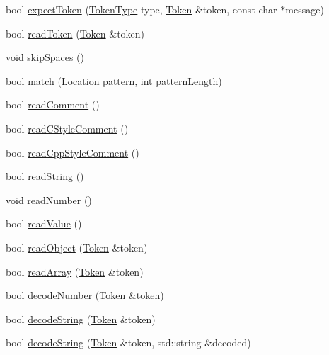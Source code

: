 \begin{DoxyCompactItemize}
\item 
bool \hyperlink{classJson_1_1Reader_a442d779d60825634625040eed83eadc5}{expect\-Token} (\hyperlink{classJson_1_1Reader_aa35e6ab574dc399a0a645ad98ed66bc9}{Token\-Type} type, \hyperlink{classJson_1_1Reader_1_1Token}{Token} \&token, const char $\ast$message)
\item 
bool \hyperlink{classJson_1_1Reader_a7cb0631963cc0fd4ff6ed0f570976864}{read\-Token} (\hyperlink{classJson_1_1Reader_1_1Token}{Token} \&token)
\item 
void \hyperlink{classJson_1_1Reader_a40d0f69d15aeb2d52ff78d794f5ab8b2}{skip\-Spaces} ()
\item 
bool \hyperlink{classJson_1_1Reader_a3e5a7bc6b7b53f2ca8cb9da42f8ffb21}{match} (\hyperlink{classJson_1_1Reader_a46795b5b272bf79a7730e406cb96375a}{Location} pattern, int pattern\-Length)
\item 
bool \hyperlink{classJson_1_1Reader_ad2690e860a1b3332c5401fb0850ba065}{read\-Comment} ()
\item 
bool \hyperlink{classJson_1_1Reader_ae0ffe796abdc3c5851589ee500e28c79}{read\-C\-Style\-Comment} ()
\item 
bool \hyperlink{classJson_1_1Reader_a6716ef6290b0f469efaf8d379c357967}{read\-Cpp\-Style\-Comment} ()
\item 
bool \hyperlink{classJson_1_1Reader_a6328a0b1994e05118886f9fc9c608643}{read\-String} ()
\item 
void \hyperlink{classJson_1_1Reader_afb31bfda6bb27d6453057a47655e8363}{read\-Number} ()
\item 
bool \hyperlink{classJson_1_1Reader_a47e56844b803d41ec993a83fadf4495c}{read\-Value} ()
\item 
bool \hyperlink{classJson_1_1Reader_a0068eb3d8e86e91f0e4806f60da66b9c}{read\-Object} (\hyperlink{classJson_1_1Reader_1_1Token}{Token} \&token)
\item 
bool \hyperlink{classJson_1_1Reader_afd9a30c0af205c9f327613f486fae6b8}{read\-Array} (\hyperlink{classJson_1_1Reader_1_1Token}{Token} \&token)
\item 
bool \hyperlink{classJson_1_1Reader_a442d1f23edf0f4350f5eeab3ee3f7d46}{decode\-Number} (\hyperlink{classJson_1_1Reader_1_1Token}{Token} \&token)
\item 
bool \hyperlink{classJson_1_1Reader_aaf736937912f5c9b8d221e57f209e3e0}{decode\-String} (\hyperlink{classJson_1_1Reader_1_1Token}{Token} \&token)
\item 
bool \hyperlink{classJson_1_1Reader_a801253570f16e91519652078fb12b8e6}{decode\-String} (\hyperlink{classJson_1_1Reader_1_1Token}{Token} \&token, std\-::string \&decoded)

\end{DoxyCompactItemize}
